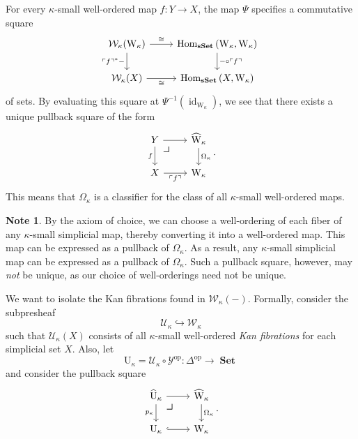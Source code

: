 \documentclass[10pt,letterpaper,cm]{nupset}
\theoremstyle{definition}
\newtheorem{note}[definition]{Note}
\theoremstyle{theorem}
\theoremstyle{remark}
\newcommand{\0}{\mathbf{0}}
\newcommand{\1}{\mathbf{1}}
\newcommand{\2}{\mathbf{2}}
\DeclareMathOperator{\op}{op}
\DeclareMathOperator{\sset}{\mathbf{sSet}}
\DeclareMathOperator{\set}{\mathbf{Set}}
\DeclareMathOperator{\Hom}{Hom}
\DeclareMathOperator{\idd}{id}
\begin{document}
For every $\kappa$-small well-ordered map $f: Y \to X$,  the map $\Psi$ specifies a commutative square
\[
\begin{tikzcd}
\mathcal{W}_{\kappa}(\mathrm{W}_{\kappa}) \arrow[d, "\ulcorner{f}\urcorner^{\ast}{-}"'] \arrow[r, "\cong"] & {\Hom_{\sset}\left(\mathrm{W}_{\kappa}, \mathrm{W}_{\kappa}\right)} \arrow[d, "{-}\circ \ulcorner{f}\urcorner"] \\
\mathcal{W}_{\kappa}(X) \arrow[r, "\cong"']                                                                & {\Hom_{\sset}\left(X, \mathrm{W}_{\kappa}\right)}                                                              
\end{tikzcd}
\] of sets. By evaluating this square at $\Psi^{-1}\left(\idd_{\mathrm{W}_{\kappa}}\right)$, we see  that there exists a unique pullback square of the form
\[
\begin{tikzcd}
Y \arrow[d, "f"'] \arrow[r]    \arrow[dr, phantom, "\scalebox{1.5}{\color{black}$\lrcorner$}" , very near start, color=black]
       & \widehat{\mathrm{W}}_{\kappa} \arrow[d, "\Omega_{\kappa}"] \\
X \arrow[r, "\ulcorner{f}\urcorner"'] & \mathrm{W}_{\kappa}                                       
\end{tikzcd}.
\] This means that $\Omega_{\kappa}$ is a classifier for the class of all $\kappa$-small well-ordered maps.

\begin{note}\label{weakuniv}
By the axiom of choice, we can choose a well-ordering of  each fiber of any $\kappa$-small simplicial map, thereby converting it into a well-ordered map. This map can be expressed as a pullback of $\Omega_{\kappa}$. As a result, any $\kappa$-small simplicial map can be expressed as a pullback of $\Omega_{\kappa}$. Such a pullback square, however, may \emph{not} be unique, as  our choice of well-orderings need not be unique.
\end{note}

\medskip

We want to isolate the Kan fibrations found in $\mathcal{W}_{\kappa}({-})$. Formally, consider the subpresheaf $$\mathcal{U}_{\kappa} \hookrightarrow \mathcal{W}_{\kappa}$$ such that $\mathcal{U}_{\kappa}(X)$ consists of all $\kappa$-small well-ordered \emph{Kan fibrations} for each simplicial set $X$. Also, let
\[
\mathrm{U}_{\kappa} = \mathcal{U}_{\kappa}\circ \mathcal{Y}^{\op} : \varDelta^{\op} \to \set
\]
and consider the pullback square
\[
\begin{tikzcd}
\widehat{\mathrm{U}}_{\kappa} \arrow[r]  \arrow[dr, phantom, "\scalebox{1.5}{\color{black}$\lrcorner$}" , very near start, color=black]
\arrow[d, "p_{\kappa}"'] & \widehat{\mathrm{W}}_{\kappa} \arrow[d, "\Omega_{\kappa}"] \\
\mathrm{U}_{\kappa} \arrow[r, hook]                              & \mathrm{W}_{\kappa}                                       
\end{tikzcd}.
\]
\end{document}
